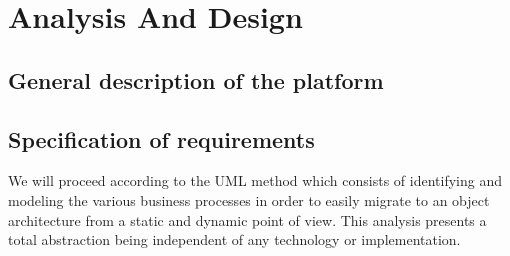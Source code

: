 

\setcounter{mtc}{8}
\chapter{Analysis And Design}%
\label{chap:chapter_two}
\minitoc
\section{General description of the platform}



\section{Specification of requirements}
We will proceed according to the UML method which consists of identifying and modeling the various business processes in order to easily migrate to an object architecture from a static and dynamic point of view. This analysis presents a total abstraction being independent of any technology or implementation.

